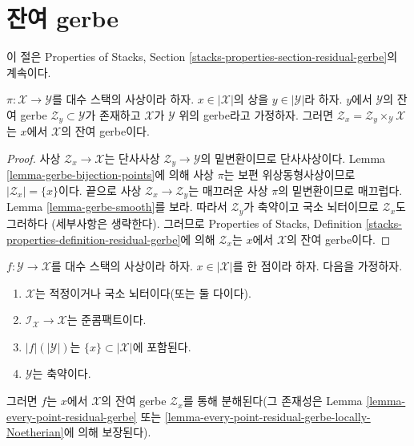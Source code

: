 \section{잔여 gerbe}
\label{section-residual-gerbe}

\noindent
이 절은 Properties of Stacks, Section
\ref{stacks-properties-section-residual-gerbe}의 계속이다.

\begin{lemma}
\label{lemma-gerbe-residual-gerbe}
$\pi : \mathcal{X} \to \mathcal{Y}$를 대수 스택의 사상이라 하자.
$x \in |\mathcal{X}|$의 상을 $y \in |\mathcal{Y}|$라 하자.
$y$에서 $\mathcal{Y}$의 잔여 gerbe $\mathcal{Z}_y \subset \mathcal{Y}$가
존재하고 $\mathcal{X}$가 $\mathcal{Y}$ 위의 gerbe라고 가정하자.
그러면 $\mathcal{Z}_x = \mathcal{Z}_y \times_\mathcal{Y} \mathcal{X}$는
$x$에서 $\mathcal{X}$의 잔여 gerbe이다.
\end{lemma}

\begin{proof}
사상 $\mathcal{Z}_x \to \mathcal{X}$는 단사사상
$\mathcal{Z}_y \to \mathcal{Y}$의 밑변환이므로 단사사상이다.
Lemma \ref{lemma-gerbe-bijection-points}에 의해 사상 $\pi$는 보편
위상동형사상이므로 $|\mathcal{Z}_x| = \{x\}$이다. 끝으로 사상
$\mathcal{Z}_x \to \mathcal{Z}_y$는 매끄러운 사상 $\pi$의 밑변환이므로
매끄럽다. Lemma \ref{lemma-gerbe-smooth}를 보라. 따라서
$\mathcal{Z}_y$가 축약이고 국소 뇌터이므로 $\mathcal{Z}_x$도 그러하다
(세부사항은 생략한다). 그러므로 Properties of Stacks, Definition
\ref{stacks-properties-definition-residual-gerbe}에 의해
$\mathcal{Z}_x$는 $x$에서 $\mathcal{X}$의 잔여 gerbe이다.
\end{proof}

\begin{lemma}
\label{lemma-factor-through-residual-space}
$f : \mathcal{Y} \to \mathcal{X}$를 대수 스택의 사상이라 하자.
$x \in |\mathcal{X}|$를 한 점이라 하자. 다음을 가정하자.
\begin{enumerate}
\item $\mathcal{X}$는 적정이거나 국소 뇌터이다(또는 둘 다이다).
\item $\mathcal{I}_\mathcal{X} \to \mathcal{X}$는 준콤팩트이다.
\item $|f|(|\mathcal{Y}|)$는 $\{x\} \subset |\mathcal{X}|$에 포함된다.
\item $\mathcal{Y}$는 축약이다.
\end{enumerate}
그러면 $f$는 $x$에서 $\mathcal{X}$의 잔여 gerbe $\mathcal{Z}_x$를 통해
분해된다(그 존재성은 Lemma \ref{lemma-every-point-residual-gerbe} 또는
\ref{lemma-every-point-residual-gerbe-locally-Noetherian}에 의해 보장된다).
\end{lemma}

